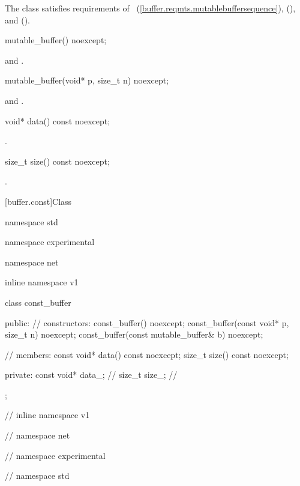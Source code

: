 \pnum
The  class satisfies requirements of ~(\ref{buffer.reqmts.mutablebuffersequence}),  (), and  ().

\begin{itemdecl}
mutable_buffer() noexcept;
\end{itemdecl}

\begin{itemdescr}
\pnum
\postconditions {} and .
\end{itemdescr}

\begin{itemdecl}
mutable_buffer(void* p, size_t n) noexcept;
\end{itemdecl}

\begin{itemdescr}
\pnum
\postconditions {} and .
\end{itemdescr}

\begin{itemdecl}
void* data() const noexcept;
\end{itemdecl}

\begin{itemdescr}
\pnum
\returns {}.
\end{itemdescr}

\begin{itemdecl}
size_t size() const noexcept;
\end{itemdecl}

\begin{itemdescr}
\pnum
\returns {}.
\end{itemdescr}



[buffer.const]{Class }

\begin{codeblock}
namespace std {
namespace experimental {
namespace net {
inline namespace v1 {

  class const_buffer
  {
  public:
    // constructors:
    const_buffer() noexcept;
    const_buffer(const void* p, size_t n) noexcept;
    const_buffer(const mutable_buffer& b) noexcept;

    // members:
    const void* data() const noexcept;
    size_t size() const noexcept;

  private:
    const void* data_; // \expos
    size_t size_; // \expos
  };

} // inline namespace v1
} // namespace net
} // namespace experimental
} // namespace std
\end{codeblock}

